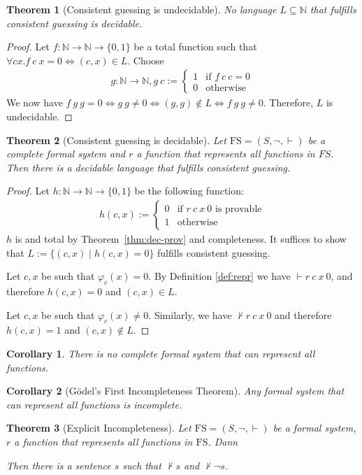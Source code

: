 \documentclass{scrartcl}
\newtheorem{theorem}{Theorem}
\newtheorem{corollary}{Corollary}[theorem]
\newcommand{\FS}{\mathrm{FS}}
\newcommand{\NN}{\mathbb{N}}
\let\oldvdash\vdash
\renewcommand{\vdash}{{\oldvdash}}
\let\oldnvdash\nvdash
\renewcommand{\nvdash}{{\oldnvdash}}
\begin{document}
\begin{theorem}[Consistent guessing is undecidable]
  No language $L \subseteq \NN$ that fulfills consistent guessing is decidable.
\end{theorem}
\begin{proof}
  Let $f : \NN \to \NN \to \{0, 1\}$ be a total function such that $\forall cx. f~c~x = 0 \iff (c, x) \in L$. Choose
  \begin{align*}
    g : \NN \to \NN,  g~c := \begin{cases}
      1 & \text{if } f~c~c = 0 \\
      0 & \text{otherwise}
    \end{cases}
  \end{align*}
  We now have $f~g~g = 0 \iff g~g \neq 0 \iff (g, g) \notin L \iff f~g~g \neq 0$. Therefore, $L$ is undecidable.
\end{proof}

\begin{theorem}[Consistent guessing is decidable]
  Let $\FS = (S, \neg, \vdash)$ be a complete formal system  and $r$ a function that represents all functions in $FS$. Then there is a decidable language that fulfills consistent guessing.
\end{theorem}
\begin{proof}
  Let $h : \NN \to \NN \to \{0, 1\}$ be the following function:
  \begin{align*}
    h(c, x) := \begin{cases}
      0 & \text{if } r~c~x~0 \text{ is provable} \\
      1 & \text{otherwise}
    \end{cases}
  \end{align*}
  $h$ is and total by Theorem~\ref{thm:dec-prov} and completeness. It suffices to show that $L := \{(c, x) \mid h(c, x) = 0\}$ fulfills consistent guessing.

  Let $c, x$ be such that $\varphi_{c}(x) = 0$. By Definition \ref{def:repr} we have $\vdash r~c~x~0$, and therefore $h(c, x) = 0$ and $(c, x) \in L$.

  Let $c, x$ be such that $\varphi_{c}(x) \neq 0$. Similarly, we have $\nvdash r~c~x~0$ and therefore $h(c, x) = 1$ and $(c, x) \notin L$.
\end{proof}

\begin{corollary}
  There is no complete formal system that can represent all functions.
\end{corollary}
\begin{corollary}[Gödel's First Incompleteness Theorem]
  Any formal system that can represent all functions is incomplete.
\end{corollary}

\begin{theorem}[Explicit Incompleteness]
  Let $\FS = (S, \neg, \vdash)$ be a formal system, $r$ a function that represents all functions in $\FS$. Dann



  Then there is a sentence $s$ such that $\nvdash s$ and $\nvdash \neg s$.
\end{theorem}
\end{document}
